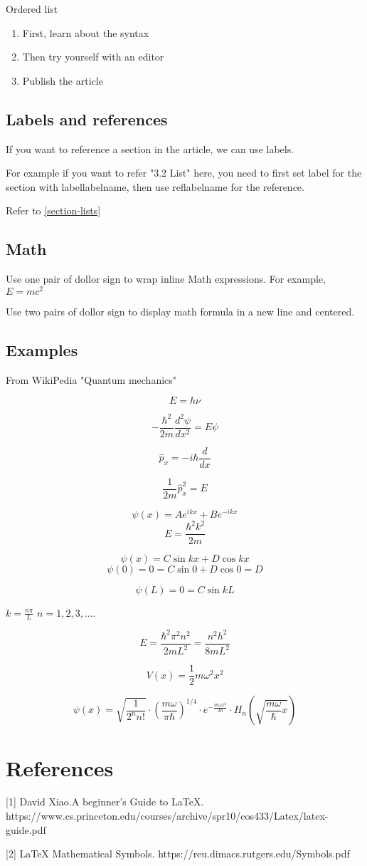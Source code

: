 \documentclass{article}
\begin{document}
Ordered list

\begin{enumerate}
	\item First, learn about the syntax
	\item Then try yourself with an editor
	\item Publish the article
\end{enumerate}

\subsection{Labels and references}

If you want to reference a section in the article, we can use labels.

For example if you want to refer "3.2 List" here, you need to first set label 
for the section with label{labelname}, then use ref{labelname} for the reference.

Refer to \ref{section-lists}

\subsection{Math}

Use one pair of dollor sign to wrap inline Math expressions. For example, $E=mc^2$

Use two pairs of dollor sign to display math formula in a new line and centered.


\subsection{Examples}

From WikiPedia "Quantum mechanics"

$$E=h\nu$$

$$-\frac{\hbar^2}{2m}\frac{d^2 \psi}{dx^2}=E\psi$$

$$\hat{p}_x=-i\hbar\frac{d}{dx}$$

$$\frac{1}{2m}\hat{p}_x^2=E$$

$$\psi(x)=Ae^{ikx}+Be^{-ikx}$$
$$E=\frac{\hbar^2 k^2}{2m}$$

$$\psi(x)=C\sin kx+D\cos kx$$
$$\psi(0)=0=C\sin 0+D\cos 0=D$$

$$\psi(L)=0=C\sin kL$$

$k=\frac{n\pi}{L}$ \qquad $n=1,2,3,....$


$$E=\frac{\hbar^2 \pi^2 n^2}{2mL^2}=\frac{n^2h^2}{8mL^2}$$

$$V(x)=\frac{1}{2}m\omega^2x^2$$

$$\psi(x)=\sqrt{\frac{1}{2^n n!}}\cdot\left( \frac{m\omega}{\pi\hbar} \right)^{1/4}\cdot e^{-\frac{m\omega x^2}{2\hbar}}\cdot H_n \left( \sqrt{\frac{m\omega}{\hbar}x} \right)$$

\section{References}
[1] David Xiao.A beginner's Guide to LaTeX. https://www.cs.princeton.edu/courses/archive/spr10/cos433/Latex/latex-guide.pdf

[2] LaTeX Mathematical Symbols. https://reu.dimacs.rutgers.edu/Symbols.pdf
\end{document}

